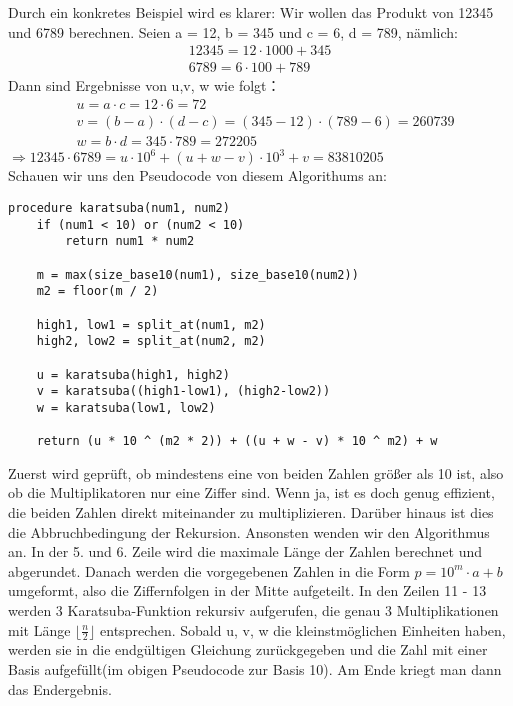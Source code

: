 \documentclass[11pt,a4paper, twoside]{article}
\theoremstyle{definition}
\begin{document}
Durch ein konkretes Beispiel wird es klarer: Wir wollen das Produkt von 12345 und 6789 berechnen. Seien a = 12, b = 345 und c = 6, d = 789, nämlich:
\begin{align*}
12345 = 12 \cdot 1000 + 345\\
6789 = 6 \cdot 100 + 789
\end{align*}
Dann sind Ergebnisse von u,v, w wie folgt：
\begin{align*}
&u = a \cdot c = 12 \cdot 6 = 72\\
&v = (b - a) \cdot (d - c) = (345 - 12) \cdot (789 - 6) = 260739\\
&w = b \cdot d = 345 \cdot 789 = 272205
\end{align*}
$\Rightarrow 12345 \cdot 6789 = u \cdot 10^{6} + (u + w - v) \cdot 10^{3} + v = 83810205$\\

Schauen wir uns den Pseudocode \cite{1} von diesem Algorithums an:\\
\begin{lstlisting}
procedure karatsuba(num1, num2)
    if (num1 < 10) or (num2 < 10)
        return num1 * num2
    
    m = max(size_base10(num1), size_base10(num2))
    m2 = floor(m / 2) 
    
    high1, low1 = split_at(num1, m2)
    high2, low2 = split_at(num2, m2)
    
    u = karatsuba(high1, high2)
    v = karatsuba((high1-low1), (high2-low2))
    w = karatsuba(low1, low2)
    
    return (u * 10 ^ (m2 * 2)) + ((u + w - v) * 10 ^ m2) + w
\end{lstlisting}
Zuerst wird geprüft, ob mindestens eine von beiden Zahlen größer als 10 ist, also ob die Multiplikatoren nur eine Ziffer sind. Wenn ja, ist es doch genug effizient, die beiden Zahlen direkt miteinander zu multiplizieren. Darüber hinaus ist dies die Abbruchbedingung der Rekursion. Ansonsten wenden wir den Algorithmus an. In der 5. und 6. Zeile wird die maximale Länge der Zahlen berechnet und abgerundet. Danach werden die vorgegebenen Zahlen in die Form $p = 10^{m} \cdot a + b$ umgeformt, also die Ziffernfolgen in der Mitte aufgeteilt. In den Zeilen 11 - 13 werden 3 Karatsuba-Funktion rekursiv aufgerufen, die genau 3 Multiplikationen mit Länge $\lfloor \frac{n}{2} \rfloor$ entsprechen. Sobald u, v, w die kleinstmöglichen Einheiten haben, werden sie in die endgültigen Gleichung zurückgegeben und die Zahl mit einer Basis aufgefüllt(im obigen Pseudocode zur Basis 10). Am Ende kriegt man dann das Endergebnis.
\end{document}
